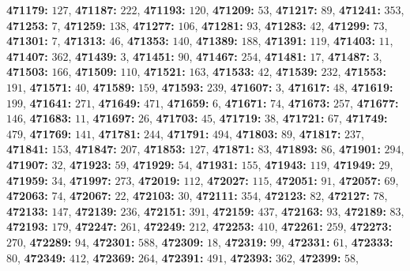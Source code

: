 \textsf{\bfseries 471179:} $127$, \textsf{\bfseries 471187:} $222$, \textsf{\bfseries 471193:} $120$, \textsf{\bfseries 471209:} $53$, \textsf{\bfseries 471217:} $89$, \textsf{\bfseries 471241:} $353$, \textsf{\bfseries 471253:} $7$, \textsf{\bfseries 471259:} $138$, \textsf{\bfseries 471277:} $106$, \textsf{\bfseries 471281:} $93$, \textsf{\bfseries 471283:} $42$, \textsf{\bfseries 471299:} $73$, \textsf{\bfseries 471301:} $7$, \textsf{\bfseries 471313:} $46$, \textsf{\bfseries 471353:} $140$, \textsf{\bfseries 471389:} $188$, \textsf{\bfseries 471391:} $119$, \textsf{\bfseries 471403:} $11$, \textsf{\bfseries 471407:} $362$, \textsf{\bfseries 471439:} $3$, \textsf{\bfseries 471451:} $90$, \textsf{\bfseries 471467:} $254$, \textsf{\bfseries 471481:} $17$, \textsf{\bfseries 471487:} $3$, \textsf{\bfseries 471503:} $166$, \textsf{\bfseries 471509:} $110$, \textsf{\bfseries 471521:} $163$, \textsf{\bfseries 471533:} $42$, \textsf{\bfseries 471539:} $232$, \textsf{\bfseries 471553:} $191$, \textsf{\bfseries 471571:} $40$, \textsf{\bfseries 471589:} $159$, \textsf{\bfseries 471593:} $239$, \textsf{\bfseries 471607:} $3$, \textsf{\bfseries 471617:} $48$, \textsf{\bfseries 471619:} $199$, \textsf{\bfseries 471641:} $271$, \textsf{\bfseries 471649:} $471$, \textsf{\bfseries 471659:} $6$, \textsf{\bfseries 471671:} $74$, \textsf{\bfseries 471673:} $257$, \textsf{\bfseries 471677:} $146$, \textsf{\bfseries 471683:} $11$, \textsf{\bfseries 471697:} $26$, \textsf{\bfseries 471703:} $45$, \textsf{\bfseries 471719:} $38$, \textsf{\bfseries 471721:} $67$, \textsf{\bfseries 471749:} $479$, \textsf{\bfseries 471769:} $141$, \textsf{\bfseries 471781:} $244$, \textsf{\bfseries 471791:} $494$, \textsf{\bfseries 471803:} $89$, \textsf{\bfseries 471817:} $237$, \textsf{\bfseries 471841:} $153$, \textsf{\bfseries 471847:} $207$, \textsf{\bfseries 471853:} $127$, \textsf{\bfseries 471871:} $83$, \textsf{\bfseries 471893:} $86$, \textsf{\bfseries 471901:} $294$, \textsf{\bfseries 471907:} $32$, \textsf{\bfseries 471923:} $59$, \textsf{\bfseries 471929:} $54$, \textsf{\bfseries 471931:} $155$, \textsf{\bfseries 471943:} $119$, \textsf{\bfseries 471949:} $29$, \textsf{\bfseries 471959:} $34$, \textsf{\bfseries 471997:} $273$, \textsf{\bfseries 472019:} $112$, \textsf{\bfseries 472027:} $115$, \textsf{\bfseries 472051:} $91$, \textsf{\bfseries 472057:} $69$, \textsf{\bfseries 472063:} $74$, \textsf{\bfseries 472067:} $22$, \textsf{\bfseries 472103:} $30$, \textsf{\bfseries 472111:} $354$, \textsf{\bfseries 472123:} $82$, \textsf{\bfseries 472127:} $78$, \textsf{\bfseries 472133:} $147$, \textsf{\bfseries 472139:} $236$, \textsf{\bfseries 472151:} $391$, \textsf{\bfseries 472159:} $437$, \textsf{\bfseries 472163:} $93$, \textsf{\bfseries 472189:} $83$, \textsf{\bfseries 472193:} $179$, \textsf{\bfseries 472247:} $261$, \textsf{\bfseries 472249:} $212$, \textsf{\bfseries 472253:} $410$, \textsf{\bfseries 472261:} $259$, \textsf{\bfseries 472273:} $270$, \textsf{\bfseries 472289:} $94$, \textsf{\bfseries 472301:} $588$, \textsf{\bfseries 472309:} $18$, \textsf{\bfseries 472319:} $99$, \textsf{\bfseries 472331:} $61$, \textsf{\bfseries 472333:} $80$, \textsf{\bfseries 472349:} $412$, \textsf{\bfseries 472369:} $264$, \textsf{\bfseries 472391:} $491$, \textsf{\bfseries 472393:} $362$, \textsf{\bfseries 472399:} $58$, 
